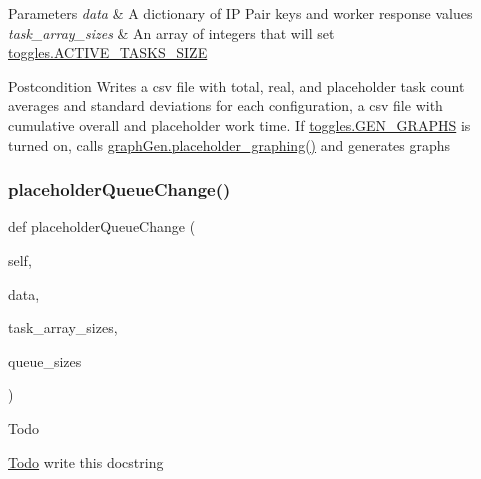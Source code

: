 \begin{DoxyParams}{Parameters}
{\em data} & A dictionary of IP Pair keys and worker response values \\
\hline
{\em task\+\_\+array\+\_\+sizes} & An array of integers that will set \mbox{\hyperlink{namespacedynamicfilterapp_1_1toggles_a374727dba0574510b39c1e2871f69e48}{toggles.\+A\+C\+T\+I\+V\+E\+\_\+\+T\+A\+S\+K\+S\+\_\+\+S\+I\+ZE}} \\
\hline
\end{DoxyParams}
\begin{DoxyPostcond}{Postcondition}
Writes a csv file with total, real, and placeholder task count averages and standard deviations for each configuration, a csv file with cumulative overall and placeholder work time. If \mbox{\hyperlink{namespacedynamicfilterapp_1_1toggles_a57c1e3f291181d680f3ee118fa5c4ab8}{toggles.\+G\+E\+N\+\_\+\+G\+R\+A\+P\+HS}} is turned on, calls \mbox{\hyperlink{namespacedynamicfilterapp_1_1graph_gen_aa390916522804b2486fb15d5af94c93a}{graph\+Gen.\+placeholder\+\_\+graphing()}} and generates graphs 
\end{DoxyPostcond}
\mbox{\label{classdynamicfilterapp_1_1test__simulations_1_1_simulation_test_a49b243b561aef89859a0f2676124dbc3}} 
\subsubsection{\texorpdfstring{placeholderQueueChange()}{placeholderQueueChange()}}
{\footnotesize\ttfamily def placeholder\+Queue\+Change (\begin{DoxyParamCaption}\item[{}]{self,  }\item[{}]{data,  }\item[{}]{task\+\_\+array\+\_\+sizes,  }\item[{}]{queue\+\_\+sizes }\end{DoxyParamCaption})}

\begin{DoxyRefDesc}{Todo}
\item[\mbox{\hyperlink{todo__todo000007}{Todo}}]write this docstring \end{DoxyRefDesc}
\mbox{\label{classdynamicfilterapp_1_1test__simulations_1_1_simulation_test_a7226eb6e9e46f40e7b99f22aade32edf}} 
